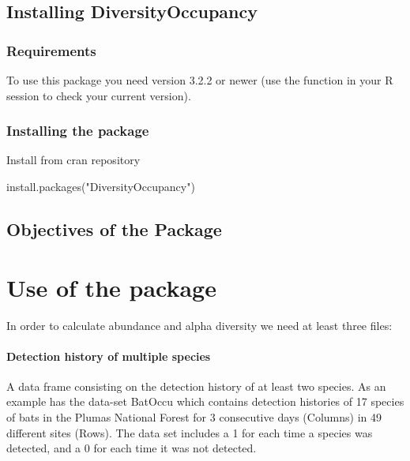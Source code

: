 \documentclass[article]{jss}
\begin{document}
\subsection{Installing
DiversityOccupancy}\label{installing-diversityoccupancy}

\subsubsection{Requirements}\label{requirements}

To use this package you need  version 3.2.2 or newer (use
the function  in your R session to check your
current version).

\subsubsection{Installing the package}\label{installing-the-package}

Install from cran repository

\begin{CodeChunk}
\begin{CodeInput}
install.packages("DiversityOccupancy")
\end{CodeInput}
\end{CodeChunk}

\subsection{Objectives of the Package}\label{objectives-of-the-package}

\section{Use of the package}\label{use-of-the-package}

In order to calculate abundance and alpha diversity we need at least
three files:

\paragraph{Detection history of multiple
species}\label{detection-history-of-multiple-species}

A data frame consisting on the detection history of at least two
species. As an example  has the data-set BatOccu
which contains detection histories of 17 species of bats in the Plumas
National Forest for 3 consecutive days (Columns) in 49 different sites
(Rows). The data set includes a 1 for each time a species was detected,
and a 0 for each time it was not detected.
\end{document}
